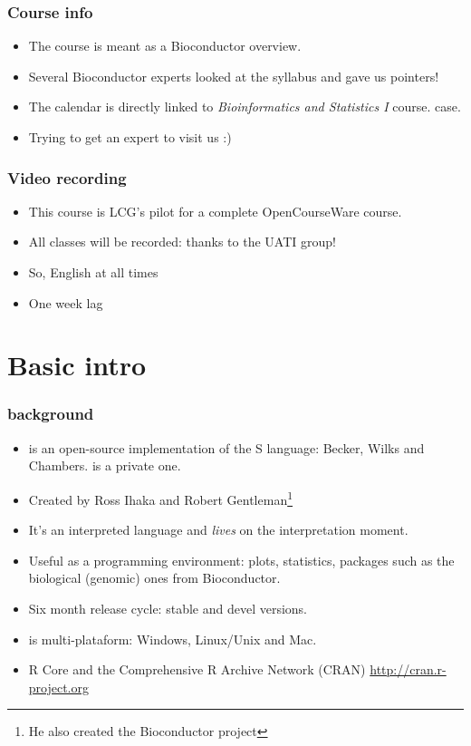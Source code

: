 \begin{frame}[allowframebreaks]
  \frametitle{Course info}
  \begin{itemize}
  \item The course is meant as a Bioconductor overview. 
  \item Several Bioconductor experts looked at the syllabus and gave us pointers!
  \item The calendar is directly linked to \emph{Bioinformatics and Statistics I} course.  case.
  \item Trying to get an expert to visit us :)
  \end{itemize}
\end{frame}


\begin{frame}[allowframebreaks]
  \frametitle{Video recording}
  \begin{itemize}
  \item This course is LCG's pilot for a complete OpenCourseWare course.
  \item All classes will be recorded: thanks to the UATI group!
  \item So, \alert{English} at all times
  \item One week lag
  \end{itemize}
\end{frame}

\section{Basic  intro}

\begin{frame}[allowframebreaks]
  \frametitle{ background}
  \begin{itemize}
  \item {} is an open-source implementation of the S language: Becker, Wilks and Chambers.  is a private one.
  \item Created by Ross Ihaka and Robert Gentleman\footnote{He also created the Bioconductor project}
  \item It's an interpreted language and \alert{\emph{lives}} on the interpretation moment.
  \item Useful as a programming environment: plots, statistics, packages such as the biological (genomic) ones from Bioconductor.
  \item Six month release cycle: stable and devel versions.
  \item {} is multi-plataform: Windows, Linux/Unix and Mac.
  \item R Core and the Comprehensive R Archive Network (CRAN) \url{http://cran.r-project.org}
  \end{itemize}
\end{frame}

